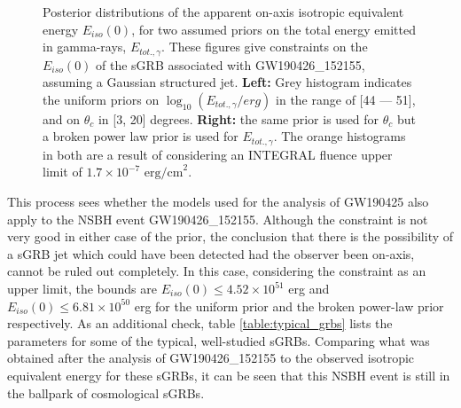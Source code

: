     \begin{figure}[H]
        \begin{subfigure}{0.5\textwidth}
              \label{fig:nsbh_unif}
              \centering
              \def\svgwidth{\textwidth}
              
        \end{subfigure}%
        \begin{subfigure}{0.5\textwidth}
              \label{fig:nsbh_bpl}
              \centering
              \def\svgwidth{\textwidth}
              
        \end{subfigure}
        \caption[Posterior distributions of the apparent on-axis isotropic equivalent
        energy $E_{iso}(0)$, in the case of GW190426\_152155.]{
            Posterior distributions of the apparent on-axis isotropic equivalent energy
            $E_{iso}(0)$, for two assumed priors on the total energy emitted in
            gamma-rays, $E_{tot., \gamma}$. These figures give constraints on the
            $E_{iso}(0)$ of the sGRB associated with GW190426\_152155, assuming a
            Gaussian structured jet. \textbf{Left:} Grey histogram indicates the uniform
            priors on $\log_{10}(E_{tot., \gamma}/erg)$ in the range of [44 --- 51], and
            on $\theta_c$ in [3, 20] degrees. \textbf{Right:} the same prior is used for
            $\theta_c$ but a broken power law prior is used for $E_{tot., \gamma}$. The
            orange histograms in both are a result of considering an INTEGRAL fluence
            upper limit of $1.7 \times 10^{-7} \text{ erg/cm}^2$.
        }
        \label{fig:nsbh_unif_bpl}
    \end{figure}

    This process sees whether the models used for the analysis of GW190425 also apply to
    the NSBH event GW190426\_152155. Although the constraint is not very good in either
    case of the prior, the conclusion that there is the possibility of a sGRB jet which
    could have been detected had the observer been on-axis, cannot be ruled out
    completely. In this case, considering the constraint as an upper limit, the bounds
    are $E_{iso}(0) \leq 4.52 \times 10^{51}$ erg and $E_{iso}(0) \leq 6.81 \times
    10^{50}$ erg for the uniform prior and the broken power-law prior respectively.  As
    an additional check, table \ref{table:typical_grbs} lists the parameters for some of
    the typical, well-studied sGRBs. Comparing what was obtained after the analysis of
    GW190426\_152155 to the observed isotropic equivalent energy for these sGRBs, it can
    be seen that this NSBH event is still in the ballpark of cosmological sGRBs.

